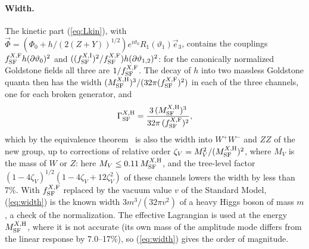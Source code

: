 \documentclass[aps,prd,twocolumn,superscriptaddress,nofootinbib,floatfix,longbibliography]{revtex4-2}
\newcommand{\SF}{{\rm SF}}
\begin{document}
\paragraph*{Width.}
The kinetic part (\ref{eq:Lkin}), with $\vec\Phi=(\Phi_0+h/(2(Z+Y))^{1/2})e^{i\vartheta_0}R_1(\vartheta_1)\vec e_3$, contains the
couplings $f^{X,{\rm F}}_\SF h(\partial\vartheta_0)^2$ and $((f^{X,{\rm I}}_\SF)^2/f^{X,{\rm F}}_\SF)h(\partial\vartheta_{1,2})^2$: for the
canonically normalized Goldstone fields all three are $1/f^{X,{\rm F}}_\SF$. The decay of $h$ into two massless Goldstone
quanta then has the width $(M^{X,{\rm H}}_\SF)^3/(32\pi(f^{X,{\rm F}}_\SF)^2)$ in each of the three channels, one for each broken
generator, and
\begin{equation}
\Gamma^{X,{\rm H}}_\SF=\frac{3\,(M^{X,{\rm H}}_\SF)^3}{32\pi\,(f^{X,{\rm F}}_\SF)^2},
\label{eq:width}
\end{equation}
which by the equivalence theorem~\cite{CLT1974,ChanowitzGaillard1985} is also the width into $W^+W^-$ and $ZZ$ of the new
group, up to corrections of relative order $\zeta_V=M_V^2/(M^{X,{\rm H}}_\SF)^2$, where $M_V$ is the mass of $W$ or $Z$: here
$M_V\le0.11\,M^{X,{\rm H}}_\SF$, and the tree-level factor $(1-4\zeta_V)^{1/2}(1-4\zeta_V+12\zeta_V^2)$ of these channels
lowers the width by less than 7\%. With $f^{X,{\rm F}}_\SF$ replaced by the vacuum value $v$ of the Standard Model,
(\ref{eq:width}) is the known width $3m^3/(32\pi v^2)$ of a heavy Higgs boson of mass $m$, a check of the normalization. The
effective Lagrangian is used at the energy $M^{X,{\rm H}}_\SF$, where it is not accurate (its own mass of the amplitude mode
differs from the linear response by 7.0\mbox{--}17\%), so (\ref{eq:width}) gives the order of magnitude.
\end{document}

